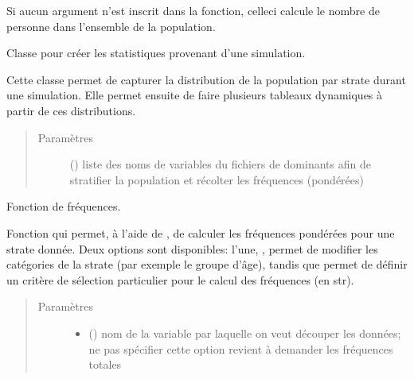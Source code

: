 \documentclass[letterpaper,10pt,french]{sphinxmanual}
\begin{document}
Si aucun argument n’est inscrit dans la fonction, celle\sphinxhyphen{}ci calcule le nombre de personne dans l’ensemble de la population.


\begin{fulllineitems}
\label{\detokenize{utilisation:simgen.statistics}}
Classe pour créer les statistiques provenant d’une simulation.

Cette classe permet de capturer la distribution de la population par strate durant une simulation. Elle permet ensuite de faire plusieurs tableaux dynamiques à partir de ces distributions.
\begin{quote}\begin{description}
\item[{Paramètres}] \leavevmode
{} () \textendash{} liste des noms de variables du fichiers de dominants afin de stratifier la population et récolter les fréquences (pondérées)

\end{description}\end{quote}

\begin{fulllineitems}
\label{\detokenize{utilisation:simgen.statistics.freq}}
Fonction de fréquences.

Fonction qui permet, à l’aide de , de calculer les fréquences pondérées pour une strate donnée. Deux options sont disponibles: l’une, , permet de modifier les catégories de la strate (par exemple le groupe d’âge), tandis que  permet de définir un critère de sélection particulier pour le calcul des fréquences (en str).
\begin{quote}\begin{description}
\item[{Paramètres}] \leavevmode\begin{itemize}
\item {} 
 () \textendash{} nom de la variable par laquelle on veut découper les données; ne pas spécifier cette option revient à demander les fréquences totales


\end{itemize}
\end{description}
\end{quote}
\end{fulllineitems}
\end{fulllineitems}
\end{document}
